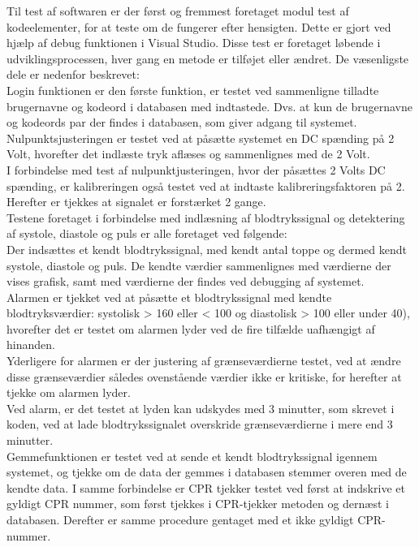 Til test af softwaren er der først og fremmest foretaget modul test af  kodeelementer, for at teste om de fungerer efter hensigten. Dette er gjort ved hjælp af debug funktionen i Visual Studio. Disse test er foretaget løbende i udviklingsprocessen, hver gang en metode er tilføjet eller ændret. De væsenligste dele er nedenfor beskrevet: \\[1ex]
Login funktionen er den første funktion, er testet ved sammenligne tilladte brugernavne og kodeord i databasen med indtastede. Dvs. at kun de brugernavne og kodeords par der findes i databasen, som giver adgang til systemet.\\[1ex]
Nulpunktsjusteringen er testet ved at påsætte systemet en DC spænding på 2 Volt, hvorefter det indlæste tryk aflæses og sammenlignes med de 2 Volt. \\
I forbindelse med test af nulpunktjusteringen, hvor der påsættes 2 Volts DC spænding, er kalibreringen også testet ved at indtaste kalibreringsfaktoren på 2. Herefter er tjekkes at signalet er forstærket 2 gange.\\[1ex]
Testene foretaget i forbindelse med indlæsning af blodtrykssignal og detektering af systole, diastole og puls er alle foretaget ved følgende:\\
Der indsættes et kendt blodtrykssignal, med kendt antal toppe og dermed kendt systole, diastole og puls. De kendte værdier sammenlignes med værdierne der vises grafisk, samt med værdierne der findes ved debugging af systemet.\\[1ex]
Alarmen er tjekket ved at påsætte et blodtrykssignal med kendte blodtryksværdier: systolisk > 160 eller < 100 og diastolisk > 100 eller under 40), hvorefter det er testet om alarmen lyder ved de fire tilfælde uafhængigt af hinanden.\\ Yderligere for alarmen er der justering af grænseværdierne testet, ved at ændre disse grænseværdier således ovenstående værdier ikke er kritiske, for herefter at tjekke om alarmen lyder.\\ Ved alarm, er det testet at lyden kan udskydes med 3 minutter, som skrevet i koden, ved at lade blodtrykssignalet overskride grænseværdierne i mere end 3 minutter.\\[1ex]
Gemmefunktionen er testet ved at sende et kendt blodtrykssignal igennem systemet, og tjekke om de data der gemmes i databasen stemmer overen med de kendte data. I samme forbindelse er CPR tjekker testet ved først at indskrive et gyldigt CPR nummer, som først tjekkes i CPR-tjekker metoden og dernæst i databasen. Derefter er samme procedure gentaget med et ikke gyldigt CPR-nummer.


